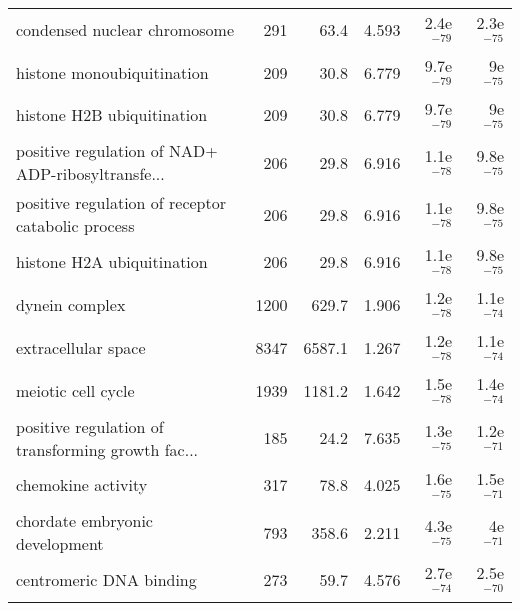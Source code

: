 \begin{longtable}{lrrrrr}
                      condensed nuclear chromosome &                     291 &                    63.4 &      4.593 &         2.4e$^{-79}$ &         2.3e$^{-75}$ \\
                        histone monoubiquitination &                     209 &                    30.8 &      6.779 &         9.7e$^{-79}$ &           9e$^{-75}$ \\
                        histone H2B ubiquitination &                     209 &                    30.8 &      6.779 &         9.7e$^{-79}$ &           9e$^{-75}$ \\
 positive regulation of NAD+ ADP-ribosyltransfe... &                     206 &                    29.8 &      6.916 &         1.1e$^{-78}$ &         9.8e$^{-75}$ \\
 positive regulation of receptor catabolic process &                     206 &                    29.8 &      6.916 &         1.1e$^{-78}$ &         9.8e$^{-75}$ \\
                        histone H2A ubiquitination &                     206 &                    29.8 &      6.916 &         1.1e$^{-78}$ &         9.8e$^{-75}$ \\
                                    dynein complex &                    1200 &                   629.7 &      1.906 &         1.2e$^{-78}$ &         1.1e$^{-74}$ \\
                               extracellular space &                    8347 &                  6587.1 &      1.267 &         1.2e$^{-78}$ &         1.1e$^{-74}$ \\
                                meiotic cell cycle &                    1939 &                  1181.2 &      1.642 &         1.5e$^{-78}$ &         1.4e$^{-74}$ \\
 positive regulation of transforming growth fac... &                     185 &                    24.2 &      7.635 &         1.3e$^{-75}$ &         1.2e$^{-71}$ \\
                                chemokine activity &                     317 &                    78.8 &      4.025 &         1.6e$^{-75}$ &         1.5e$^{-71}$ \\
                    chordate embryonic development &                     793 &                   358.6 &      2.211 &         4.3e$^{-75}$ &           4e$^{-71}$ \\
                           centromeric DNA binding &                     273 &                    59.7 &      4.576 &         2.7e$^{-74}$ &         2.5e$^{-70}$ \\

\end{longtable}
